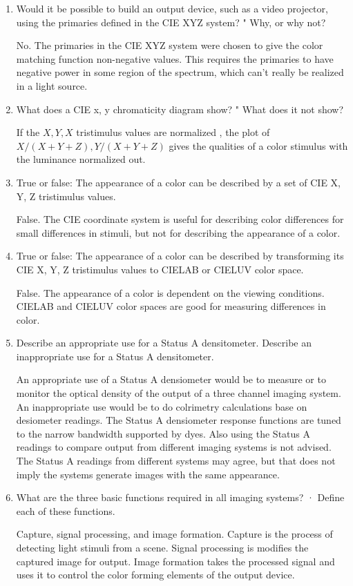 \begin{enumerate}
 \item
 Would it be possible to build an output device, such as a video projector, using the primaries defined in the CIE XYZ system? " Why, or why not?
 \par No.  The primaries in the CIE XYZ system were chosen to give the color matching function non-negative values.  This requires the primaries to have negative power in some region of the spectrum, which can't really be realized in a light source.
 \item
 What does a CIE x, y chromaticity diagram show? "   What does it not show?
 \par If the $X, Y, X$  tristimulus values are normalized , the plot of $X/(X+Y+Z), Y/(X+Y+Z)$ gives the qualities of a color stimulus with the luminance normalized out.
 \item
 True or false: The appearance of a color can be described by a set of CIE X, Y, Z tristimulus values.\par False.  The CIE coordinate system is useful for describing color differences for small differences in stimuli, but not for describing the appearance of a color.
 \item
 True or false: The appearance of a color can be described by transforming its CIE X, Y, Z tristimulus values to CIELAB or CIELUV color space.
 \par  False.   The appearance of a color is dependent on the viewing conditions.  CIELAB and CIELUV color spaces are good for measuring differences in color.
 \item
  Describe an appropriate use for a Status A densitometer. Describe an inappropriate use for a Status A densitometer.
 \par  An appropriate use of a Status A densiometer would be to measure or to monitor the optical density of the output of a three channel imaging system.  An inappropriate use would be to do colrimetry calculations base on desiometer readings.  The Status A densiometer response functions are tuned to the narrow bandwidth supported by dyes.  Also using the Status A readings to compare output from different imaging systems is not advised.  The Status A readings from different systems may agree, but that does not imply the systems generate images with the same appearance.
 \item
 What are the three basic functions required in all imaging systems? · Define each of these functions.
 \par Capture, signal processing, and image formation.  Capture is the process of detecting light stimuli from a scene.  Signal processing is modifies the captured image for output.  Image formation takes the processed signal and uses it to control the color forming elements of the output device.

\end{enumerate}
